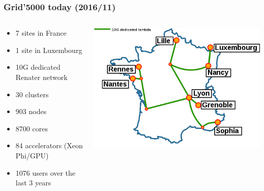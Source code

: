 \documentclass[11pt,compress]{beamer}
\begin{document}
\begin{frame}
\frametitle{Grid'5000 today (2016/11)}
\begin{columns}[c]
  \begin{column}{6cm}
	\begin{itemize}
	\item 7 sites in France
	\item 1 site in Luxembourg
	\item 10G dedicated Renater network
	\item 30 clusters
	\item 903 nodes
	\item 8700 cores
	\item 84 accelerators (Xeon Phi/GPU)
	\item 1076 users over the last 3 years
	\end{itemize}
  \end{column}
  \begin{column}{6cm}
	\includegraphics[scale=0.42]{figures/Renater5-g5k}
  \end{column}
\end{columns}
\end{frame}
\end{document}
